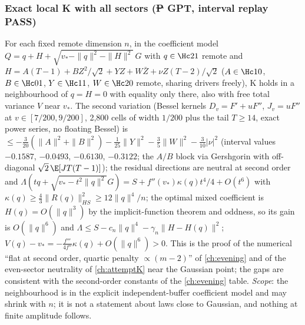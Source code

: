 \subsubsection{Exact local K with all sectors (\st{P} GPT, interval replay PASS)}\label{sec:kfull-local}
For each fixed remote dimension $n$, in the coefficient model $Q=q+H+\sqrt{v_*-\|q\|^2-\|H\|^2}\,G$ with $q\in\Hc21$ remote and
$H=A(T-1)+BZ^2/\sqrt2+YZ+W\bar Z+\nu Z(T-2)/\sqrt2$ ($A\in\Hc10$, $B\in\Hc01$, $Y\in\Hc11$, $W\in\Hc20$ remote, sharing drivers freely), K holds in a neighbourhood of $q=H=0$ with equality
only there, also with free total variance $V$ near $v_*$. The second variation (Bessel kernels $D_v=F'+uF''$, $J_v=uF''$ at $v\in[7/200,9/200]$, 2,800 cells of width $1/200$ plus the tail
$T\ge14$, exact power series, no floating Bessel) is $\le-\frac3{20}(\|A\|^2+\|B\|^2)-\frac1{25}\|Y\|^2-\frac35\|W\|^2-\frac3{10}|\nu|^2$ (interval values $-0.1587$, $-0.0493$, $-0.6130$,
$-0.3122$; the $A/B$ block via Gershgorin with off-diagonal $\sqrt2\,\E[JT(T-1)]$); the residual directions are neutral at second order and $\Lambda(tq+\sqrt{v_*-t^2\|q\|^2}G)=S+f''(v_*)\kappa(q)t^4/4+O(t^6)$
with $\kappa(q)\ge\frac43\|R(q)\|_{HS}^2\ge12\|q\|^4/n$; the optimal mixed coefficient is $H(q)=O(\|q\|^3)$ by the implicit-function theorem and oddness, so its gain is $O(\|q\|^6)$ and
$\Lambda\le S-c_n\|q\|^4-\gamma_n\|H-H(q)\|^2$; $V(q)-v_*=-\frac{f'''}{4f''}\kappa(q)+O(\|q\|^6)>0$. This is the proof of the numerical ``flat at second order, quartic penalty $\propto(m-2)$'' of
\autoref{ch:evening} and of the even-sector neutrality of \autoref{ch:attemptK} near the Gaussian point; the gaps are consistent with the second-order constants of the \autoref{ch:evening}
table. \emph{Scope}: the neighbourhood is in the explicit independent-buffer coefficient model and may shrink with $n$; it is not a statement about laws close to Gaussian, and
nothing at finite amplitude follows.

